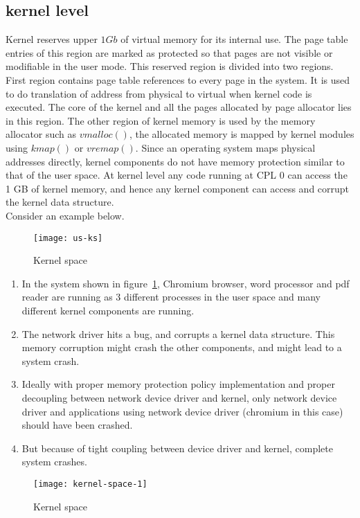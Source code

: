 \subsection{kernel level}

Kernel reserves upper $1Gb$ of virtual memory for its internal use. The page table entries of this region are marked as protected so that pages are not visible or modifiable in the user mode. This reserved region is divided into two regions. First region contains page table references to every page in the system. It is used to do translation of address from physical to virtual when kernel code is executed. The core of the kernel and all the pages allocated by page allocator lies in this region. The other region of kernel memory is used by the memory allocator such as $vmalloc()$, the allocated memory is mapped by kernel modules using $kmap()$ or $vremap()$. Since an operating system maps physical addresses directly, kernel components do not have memory protection similar to that of the user space. At kernel level any code running at CPL 0 can access the 1 GB of kernel memory, and hence any kernel component can access and corrupt the kernel data structure. 
\\
Consider an example below.
\begin{figure}[!ht]
\centering
\texttt{[image: us-ks]}
\caption{Kernel space}
\label{fig:Kernel space1}
\end{figure}

\begin{enumerate}
\item In the system shown in figure~\ref{fig:Kernel space1}, Chromium browser, word processor and pdf reader are running as 3 different processes in the user space and many different kernel components are running.
\item The network driver hits a bug, and corrupts a kernel data structure. This memory corruption might crash the other components, and might lead to a system crash.
\item Ideally with proper memory protection policy implementation and proper decoupling between network device driver and kernel, only network device driver and applications using network device driver (chromium in this case) should have been crashed. 
\item But because of tight coupling between device driver and kernel, complete system crashes.
\end{enumerate}

\begin{figure}[!ht]
\centering
\texttt{[image: kernel-space-1]}
\caption{Kernel space}
\label{fig:Kernel space2}
\end{figure}

